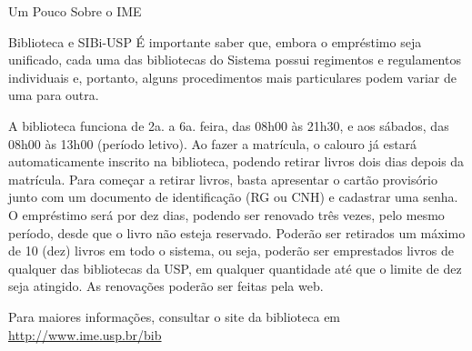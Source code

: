 \begin{secao}{Um Pouco Sobre o IME}
\begin{subsecao}{Biblioteca e SIBi-USP}
É importante saber que, embora o empréstimo seja unificado, cada uma das
bibliotecas do Sistema possui regimentos e regulamentos individuais e, portanto,
alguns procedimentos mais particulares podem variar de uma para outra.

A biblioteca funciona de 2a. a 6a. feira, das 08h00 às 21h30, e aos sábados, das
08h00 às 13h00 (período letivo). Ao fazer a matrícula, o calouro já estará
automaticamente inscrito na biblioteca, podendo retirar livros dois dias depois
da matrícula. Para começar a retirar livros, basta apresentar o cartão
provisório junto com um documento de identificação (RG ou CNH) e cadastrar uma
senha. O empréstimo será por dez dias, podendo ser renovado três vezes, pelo
mesmo período, desde que o livro não esteja reservado. Poderão ser retirados um
máximo de 10 (dez) livros em todo o sistema, ou seja, poderão ser emprestados
livros de qualquer das bibliotecas da USP, em qualquer quantidade até que o
limite de dez seja atingido. As renovações poderão ser feitas pela web.

Para maiores informações, consultar o site da biblioteca em
\url{http://www.ime.usp.br/bib}

\end{subsecao}
\end{secao}
